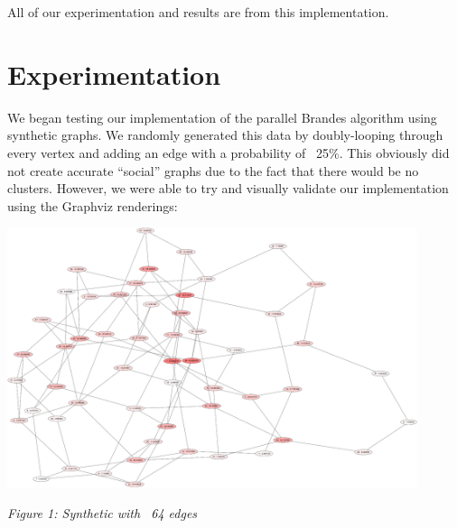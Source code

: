 \documentclass[11pt,a4paper,titlepage]{article}
\begin{document}
All of our experimentation and results are from this implementation.

\section{Experimentation} %
\label{sec:methods}

We began testing our implementation of the parallel Brandes algorithm using
synthetic graphs. We randomly generated this data by doubly-looping through
every vertex and adding an edge with a probability of ~25\%. This obviously did
not create accurate ``social'' graphs due to the fact that there would be no
clusters. However, we were able to try and visually validate our implementation
using the Graphviz renderings:

\begin{center}
\includegraphics[width=0.9\textwidth]{figures/synthetic64_2}
\end{center}
\begin{center}
\textit{Figure 1: Synthetic with ~64 edges}
\end{center}
\end{document}
